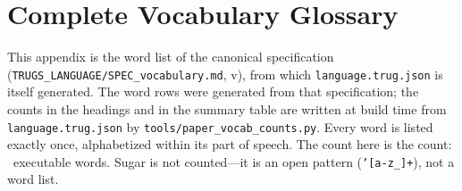 \documentclass{article}
\begin{document}
\section{Complete Vocabulary Glossary}

This appendix is the word list of the canonical specification (\texttt{TRUGS\_LANGUAGE/SPEC\_vocabulary.md}, v\VocabVersion), from which \texttt{language.trug.json} is itself generated. The word rows were generated from that specification; the counts in the headings and in the summary table are written at build time from \texttt{language.trug.json} by \texttt{tools/paper\_vocab\_counts.py}. Every word is listed exactly once, alphabetized within its part of speech. The count here is the count: \VocabTotal\ executable words. Sugar is not counted---it is an open pattern (\texttt{'[a-z\_]+}), not a word list.
\end{document}
